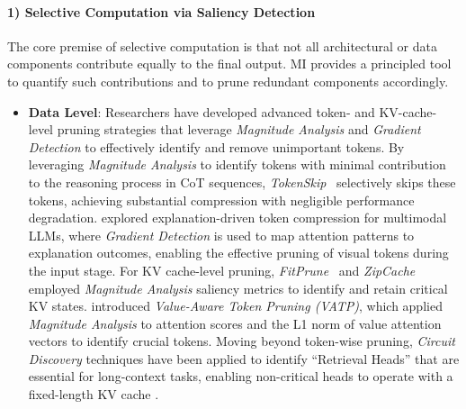\documentclass[11pt,letterpaper]{mystyle}
\begin{document}
  \paragraph{1) Selective Computation via Saliency Detection}
  The core premise of selective computation is that not all architectural or data components contribute equally to the final output. 
  MI provides a principled tool to quantify such contributions and to prune redundant components accordingly.
  \begin{itemize}[leftmargin=*]
  \item \textbf{Data Level}: 
  Researchers have developed advanced token- and KV-cache-level pruning strategies that leverage \textit{Magnitude Analysis} and \textit{Gradient Detection} to effectively identify and remove unimportant tokens.
  By leveraging \textit{Magnitude Analysis} to identify tokens with minimal contribution to the reasoning process in CoT sequences, \textit{TokenSkip}~\citep{xia-etal-2025-tokenskip} selectively skips these tokens, achieving substantial compression with negligible performance degradation.
  \citet{lei2025generictokencompressionmultimodal} explored explanation-driven token compression for multimodal LLMs, where \textit{Gradient Detection} is used to map attention patterns to explanation outcomes, enabling the effective pruning of visual tokens during the input stage.
  For KV cache-level pruning, \textit{FitPrune}~\citep{ye2025fit} and \textit{ZipCache}~\citep{he2024zipcache} employed \textit{Magnitude Analysis} saliency metrics to identify and retain critical KV states.
  \citet{guo-etal-2024-attention} introduced \textit{Value-Aware Token Pruning (VATP)}, which applied \textit{Magnitude Analysis} to attention scores and the L1 norm of value attention vectors to identify crucial tokens.
  Moving beyond token-wise pruning, \textit{Circuit Discovery} techniques have been applied to identify “Retrieval Heads” that are essential for long-context tasks, enabling non-critical heads to operate with a fixed-length KV cache \citep{tang2024razorattention,xiong2024uncomp,xiong2025parallelcomp,xiao2024duoattention}.
  

\end{itemize}
\end{document}

